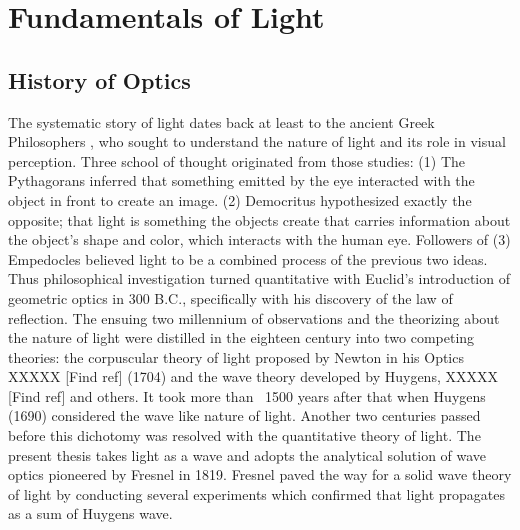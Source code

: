 \chapter{Fundamentals of Light}
\label{ch:fundamentals_of_light}






\section{History of Optics}

The systematic story of light dates back at least to the ancient Greek Philosophers \cite{Vohnsen_2004}, who sought to understand the nature of light and its role in visual perception. Three school of thought originated from those studies: (1) The Pythagorans inferred that something emitted by the eye interacted with the object in front to create an image. (2) Democritus hypothesized exactly the opposite; that light is something the objects create that carries information about the object's shape and color, which interacts with the human eye. Followers of (3)  Empedocles believed light to be a combined process of the previous two ideas. Thus philosophical investigation turned quantitative  with Euclid's introduction of geometric optics in 300 B.C.\cite{Abetti1971}, specifically with his discovery of the law of reflection. The ensuing two millennium of observations and the theorizing about the nature of light were distilled in the eighteen century into two competing theories: the corpuscular theory of light proposed by Newton in his Optics XXXXX [Find ref] (1704) and the wave theory developed by Huygens, XXXXX [Find ref] and others. It took more than ~1500 years after that when Huygens (1690) considered the wave like nature of light. Another two centuries passed before this dichotomy was resolved with the quantitative theory of light. The present thesis takes light as a wave and adopts the analytical solution of wave optics pioneered by Fresnel in 1819. Fresnel paved the way for a solid wave theory of light by conducting several experiments which confirmed that light propagates as a sum of Huygens wave. 

